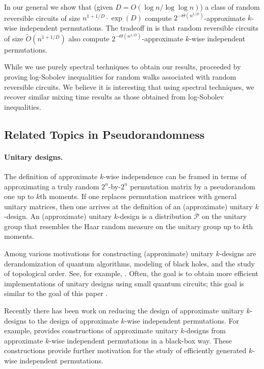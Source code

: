 In our general  we show that (given $D = O(\log n/\log\log n)$) a class of random reversible circuits of size $n^{1+1/D} \cdot \exp(D)$ compute $2^{-\Theta(n^{1/D})}$-approximate $k$-wise independent permutations. The tradeoff in \cite{gretta2024more} is that random reversible circuits of size $\widetilde{O}(n^{1+1/D})$ also compute $2^{-\Theta(n^{1/D})}$-approximate $k$-wise independent permutations. 

While we use purely spectral techniques to obtain our results, \cite{gretta2024more} proceeded by proving log-Sobolev inequalities for random walks associated with random reversible circuits. We believe it is interesting that using spectral techniques, we recover similar mixing time results as those obtained from log-Sobolev inequalities.




\subsection{Related Topics in Pseudorandomness}

\paragraph{Unitary designs.} The definition of approximate $k$-wise independence can be framed in terms of approximating a truly random $2^n$-by-$2^n$ permutation matrix by a pseudorandom one up to $k$th moments. If one replaces permutation matrices with general unitary matrices, then one arrives at the definition of an (approximate) unitary $k$-design. An (approximate) unitary $k$-design is a distribution $\mathcal{P}$ on the unitary group that resembles the Haar random measure on the unitary group up to $k$th moments. 

Among various motivations for constructing (approximate) unitary $k$-designs are derandomization of quantum algorithms, modeling of black holes, and the study of topological order. See, for example, \cite{hayden2007black,scott2008optimizing,brandao2016local,dankert2009exact,huang2020predicting}. Often, the goal is to obtain more efficient implementations of unitary designs using small quantum circuits; this goal is similar to the goal of this paper \cite{brandao2016local,hunter2019unitary,haferkamp2021improved,harrow2023approximate,haferkamp2023efficient,chen2024efficient,metger2024simple,chen2024incompressibility,ma2024construct}.

Recently there has been work on reducing the design of approximate unitary $k$-designs to the design of approximate $k$-wise independent permutations. For example, \cite{metger2024simple,chen2024efficient} provides constructions of approximate unitary $k$-designs from approximate $k$-wise independent permutations in a black-box way. These constructions provide further motivation for the study of efficiently generated $k$-wise independent permutations.

